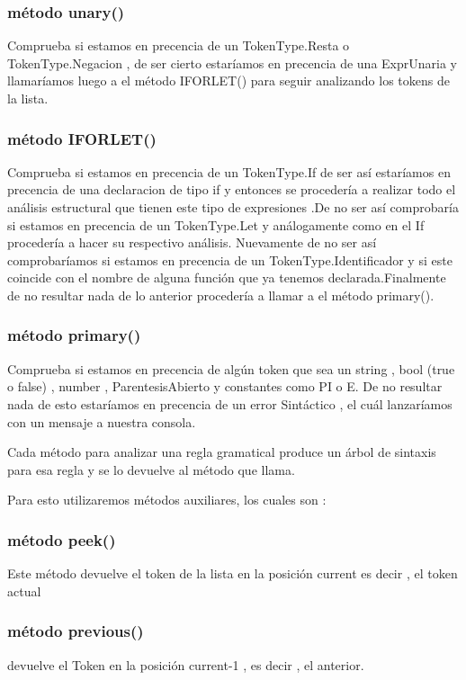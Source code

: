 \documentclass[a4paper,12pt]{article}
\begin{document}
\subsubsection[short]{ método unary()}
Comprueba si estamos en precencia de un TokenType.Resta o TokenType.Negacion , de ser cierto estaríamos en precencia de una ExprUnaria y llamaríamos luego a el método IFORLET() para seguir analizando los tokens de la lista.
\subsubsection[short]{ método IFORLET()}
Comprueba si estamos en precencia de un TokenType.If de ser así estaríamos en precencia de una declaracion de tipo if y entonces se procedería a realizar todo el análisis estructural que tienen este tipo de expresiones 
.De no ser así comprobaría si estamos en precencia de un TokenType.Let y análogamente como en el If procedería a hacer su respectivo análisis.
Nuevamente de no ser así comprobaríamos si estamos en precencia de un TokenType.Identificador y si este coincide con el nombre de alguna función que ya tenemos declarada.Finalmente de no resultar nada de lo anterior procedería a llamar a el método primary(). 
\subsubsection[short]{ método primary()}
Comprueba si estamos en precencia de algún token que sea un string , bool (true o false) , number , ParentesisAbierto y constantes como PI o E. De no resultar nada de esto estaríamos en precencia de un error Sintáctico , el cuál lanzaríamos con un mensaje a nuestra consola.


Cada método para analizar una regla gramatical produce un árbol de sintaxis para esa regla y se lo devuelve al método que llama. 

Para esto utilizaremos métodos auxiliares,  los cuales son :

\subsubsection[short]{método peek()} 
Este método devuelve el token de la lista en la posición current es decir , el token actual

\subsubsection[short]{método previous()} 
devuelve el Token en la posición current-1 , es decir , el anterior. 
\end{document}
